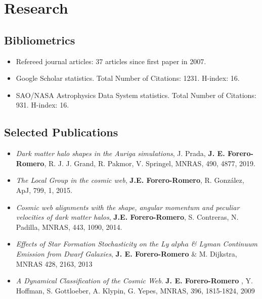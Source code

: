 \documentclass[a4paper,10pt]{article} %
\begin{document}
\color{red}
\section{Research}
\color{black}

\subsection{Bibliometrics}
\begin{itemize}
\item Refereed journal articles:  37 articles since first paper in 2007.
\item Google Scholar statistics. Total Number of Citations: 1231. H-index: 16.
\item SAO/NASA Astrophysics Data System statistics. Total Number of
  Citations: 931. H-index: 16. 
\end{itemize}


\subsection{Selected Publications}
\begin{itemize}

\item {\it Dark matter halo shapes in the Auriga simulations}, 
  J. Prada, {\bf J. E. Forero-Romero}, R. J. J. Grand, R. Pakmor, 
  V. Springel,  MNRAS, 490, 4877, 2019.

\item{\it The Local Group in the cosmic web}, {\bf
  J.E. Forero-Romero}, R. Gonz\'alez, ApJ, 799, 1, 2015.

\item{\it Cosmic web alignments with the shape, angular momentum
  and peculiar velocities of dark matter halos}, 
  {\bf J.E. Forero-Romero}, S. Contreras, N. Padilla, MNRAS, 443,
  1090, 2014. 

\item {\it Effects of Star Formation Stochasticity on the Ly
  $alpha$ \& Lyman Continuum Emission from Dwarf Galaxies}, {\bf
  J. E. Forero-Romero} \& M. Dijkstra, MNRAS 428, 2163, 2013 

\item  {\it A Dynamical Classification of the  Cosmic Web}.  {\bf
  J. E. Forero-Romero} , Y. Hoffman,  S. Gottloeber, A. Klypin, G. Yepes, 
MNRAS, 396, 1815-1824, 2009   

\end{itemize}
\end{document}
